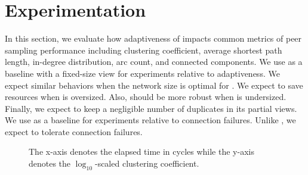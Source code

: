 \section{Experimentation}
\label{sec:experiments}

In this section, we evaluate how adaptiveness of \SPRAY impacts common
metrics of peer sampling performance including clustering coefficient,
average shortest path length, in-degree distribution, arc count, and
connected components. We use \CYCLON as a baseline with a fixed-size
view for experiments relative to adaptiveness. We expect similar
behaviors when the network size is optimal for \CYCLON. We expect
\SPRAY to save resources when \CYCLON is oversized. Also, \SPRAY
should be more robust when \CYCLON is undersized. Finally, we expect
\SPRAY to keep a negligible number of duplicates in its partial
views. We use \SCAMP as a baseline for experiments relative to
connection failures. Unlike \SCAMP, we expect \SPRAY to
tolerate connection failures.

\begin{figure}
  \centering
  \hspace{10pt}
  \caption{\label{fig:clustering}The x-axis denotes the elapsed time in cycles
    while the y-axis denotes the $\log_{10}$-scaled clustering coefficient.}
\end{figure}


